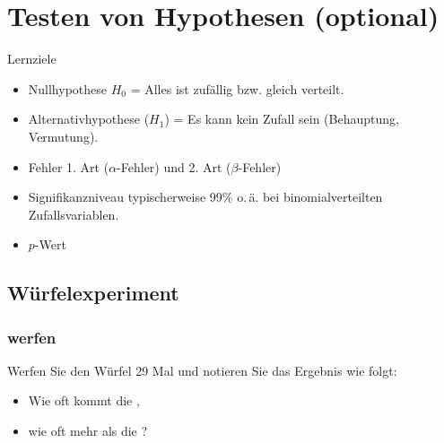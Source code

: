 
\section{Testen von Hypothesen (optional)}


Lernziele

\begin{itemize}
\item Nullhypothese $H_0$ = Alles ist zufällig bzw. gleich verteilt.

\item Alternativhypothese ($H_1$) = Es kann kein Zufall sein
  (Behauptung, Vermutung). 

\item Fehler 1. Art ($\alpha$-Fehler) und 2. Art ($\beta$-Fehler)
  
\item Signifikanzniveau typischerweise 99\%
  o.\,ä. bei binomialverteilten Zufallsvariablen.

\item $p$-Wert
  
\end{itemize}

\newpage

\subsection{Würfelexperiment}





\subsubsection{ werfen}

Werfen Sie den Würfel 29 Mal und notieren Sie das Ergebnis wie folgt:
\begin{itemize}
\item Wie oft kommt die ,
\item wie oft mehr als die ?
\end{itemize}

